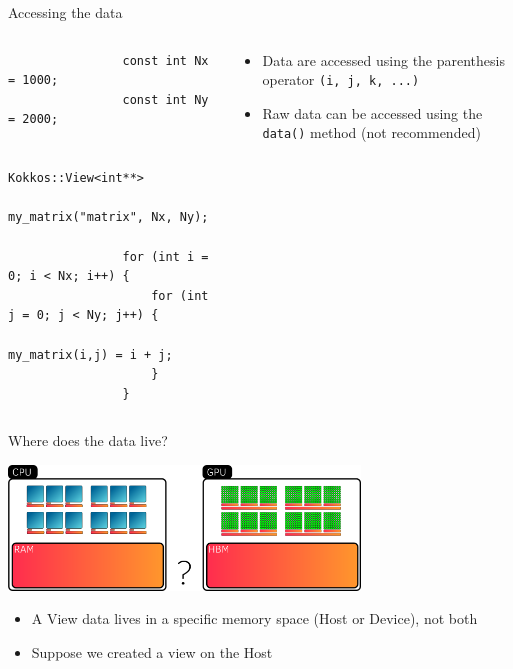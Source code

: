 \documentclass[aspectratio=169]{beamer}
\begin{document}
\begin{frame}[fragile]{Accessing the data}
    \begin{columns}
        \begin{column}{0.6\linewidth}
            \begin{verbatim}
                const int Nx = 1000;
                const int Ny = 2000;

                Kokkos::View<int**>
                    my_matrix("matrix", Nx, Ny);

                for (int i = 0; i < Nx; i++) {
                    for (int j = 0; j < Ny; j++) {
                        my_matrix(i,j) = i + j;
                    }
                }
            \end{verbatim}
        \end{column}
        \begin{column}{0.4\linewidth}
            \begin{itemize}
                \item Data are accessed using the parenthesis operator \texttt{(i, j, k, ...)}
                \item Raw data can be accessed using the \texttt{data()} method (not recommended)
            \end{itemize}
        \end{column}
    \end{columns}
\end{frame}


\begin{frame}{Where does the data live?}
    \begin{center}
        \includegraphics[width=0.7\textwidth]{view_memory.png}
    \end{center}
    \begin{itemize}
        \item A View data lives in a specific memory space (Host or Device), not both
        \item Suppose we created a view on the Host
    \end{itemize}
\end{frame}
\end{document}
